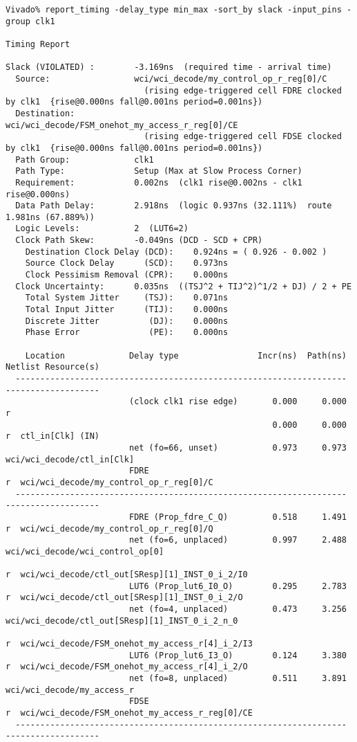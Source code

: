 \documentclass{article}
\begin{document}
\begin{lstlisting}
Vivado% report_timing -delay_type min_max -sort_by slack -input_pins -group clk1

Timing Report

Slack (VIOLATED) :        -3.169ns  (required time - arrival time)
  Source:                 wci/wci_decode/my_control_op_r_reg[0]/C
                            (rising edge-triggered cell FDRE clocked by clk1  {rise@0.000ns fall@0.001ns period=0.001ns})
  Destination:            wci/wci_decode/FSM_onehot_my_access_r_reg[0]/CE
                            (rising edge-triggered cell FDSE clocked by clk1  {rise@0.000ns fall@0.001ns period=0.001ns})
  Path Group:             clk1
  Path Type:              Setup (Max at Slow Process Corner)
  Requirement:            0.002ns  (clk1 rise@0.002ns - clk1 rise@0.000ns)
  Data Path Delay:        2.918ns  (logic 0.937ns (32.111%)  route 1.981ns (67.889%))
  Logic Levels:           2  (LUT6=2)
  Clock Path Skew:        -0.049ns (DCD - SCD + CPR)
    Destination Clock Delay (DCD):    0.924ns = ( 0.926 - 0.002 ) 
    Source Clock Delay      (SCD):    0.973ns
    Clock Pessimism Removal (CPR):    0.000ns
  Clock Uncertainty:      0.035ns  ((TSJ^2 + TIJ^2)^1/2 + DJ) / 2 + PE
    Total System Jitter     (TSJ):    0.071ns
    Total Input Jitter      (TIJ):    0.000ns
    Discrete Jitter          (DJ):    0.000ns
    Phase Error              (PE):    0.000ns

    Location             Delay type                Incr(ns)  Path(ns)    Netlist Resource(s)
  -------------------------------------------------------------------    -------------------
                         (clock clk1 rise edge)       0.000     0.000 r  
                                                      0.000     0.000 r  ctl_in[Clk] (IN)
                         net (fo=66, unset)           0.973     0.973    wci/wci_decode/ctl_in[Clk]
                         FDRE                                         r  wci/wci_decode/my_control_op_r_reg[0]/C
  -------------------------------------------------------------------    -------------------
                         FDRE (Prop_fdre_C_Q)         0.518     1.491 r  wci/wci_decode/my_control_op_r_reg[0]/Q
                         net (fo=6, unplaced)         0.997     2.488    wci/wci_decode/wci_control_op[0]
                                                                      r  wci/wci_decode/ctl_out[SResp][1]_INST_0_i_2/I0
                         LUT6 (Prop_lut6_I0_O)        0.295     2.783 r  wci/wci_decode/ctl_out[SResp][1]_INST_0_i_2/O
                         net (fo=4, unplaced)         0.473     3.256    wci/wci_decode/ctl_out[SResp][1]_INST_0_i_2_n_0
                                                                      r  wci/wci_decode/FSM_onehot_my_access_r[4]_i_2/I3
                         LUT6 (Prop_lut6_I3_O)        0.124     3.380 r  wci/wci_decode/FSM_onehot_my_access_r[4]_i_2/O
                         net (fo=8, unplaced)         0.511     3.891    wci/wci_decode/my_access_r
                         FDSE                                         r  wci/wci_decode/FSM_onehot_my_access_r_reg[0]/CE
  -------------------------------------------------------------------    -------------------


\end{lstlisting}
\end{document}
